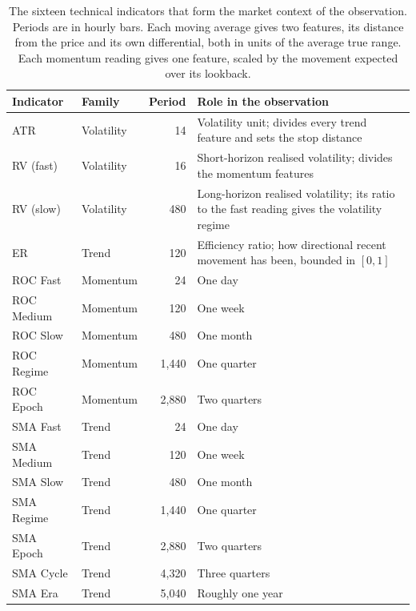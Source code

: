 \begin{table}[htb!]
\centering
\footnotesize
\caption{The sixteen technical indicators that form the market context of the observation. Periods are in hourly bars. Each moving average gives two features, its distance from the price and its own differential, both in units of the average true range. Each momentum reading gives one feature, scaled by the movement expected over its lookback.}
\label{Tables:Observation}
\begin{tabularx}{\textwidth}{@{}llrX@{}}
\toprule
\textbf{Indicator} & \textbf{Family} & \textbf{Period} & \textbf{Role in the observation} \\
\midrule
ATR & Volatility & 14 & Volatility unit; divides every trend feature and sets the stop distance \\
\addlinespace
RV (fast) & Volatility & 16 & Short-horizon realised volatility; divides the momentum features \\
RV (slow) & Volatility & 480 & Long-horizon realised volatility; its ratio to the fast reading gives the volatility regime \\
\addlinespace
ER & Trend & 120 & Efficiency ratio; how directional recent movement has been, bounded in $[0, 1]$ \\
\addlinespace
ROC Fast & Momentum & 24 & One day \\
ROC Medium & Momentum & 120 & One week \\
ROC Slow & Momentum & 480 & One month \\
ROC Regime & Momentum & 1{,}440 & One quarter \\
ROC Epoch & Momentum & 2{,}880 & Two quarters \\
\addlinespace
SMA Fast & Trend & 24 & One day \\
SMA Medium & Trend & 120 & One week \\
SMA Slow & Trend & 480 & One month \\
SMA Regime & Trend & 1{,}440 & One quarter \\
SMA Epoch & Trend & 2{,}880 & Two quarters \\
SMA Cycle & Trend & 4{,}320 & Three quarters \\
SMA Era & Trend & 5{,}040 & Roughly one year \\
\bottomrule
\end{tabularx}
\end{table}